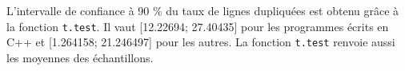 L'intervalle de confiance à 90 \% du taux de lignes dupliquées est
obtenu grâce à la fonction \lstinline{t.test}. Il vaut [12.22694; 27.40435]
pour les programmes écrits en C++ et [1.264158; 21.246497] pour les
autres. La fonction \lstinline{t.test} renvoie aussi les moyennes des
échantillons.
